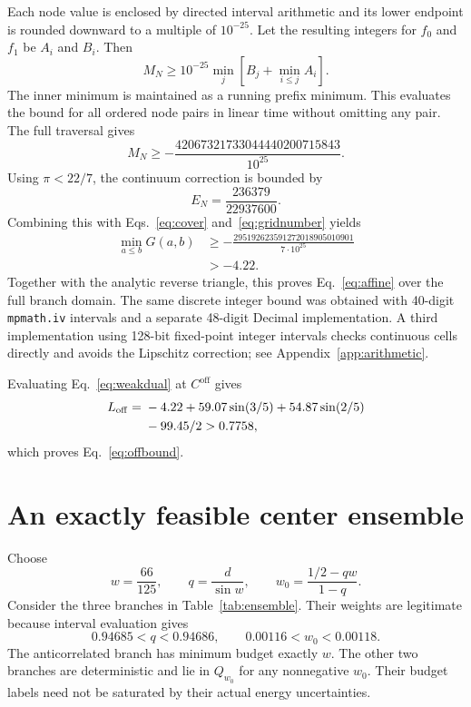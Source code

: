 \documentclass[aps,pra,reprint,amsmath,amssymb,longbibliography,nofootinbib]{revtex4-2}
\newcommand{\Coff}{C^{\mathrm{off}}}
\newcommand{\Loff}{L_{\mathrm{off}}}
\begin{document}
Each node value is enclosed by directed interval arithmetic and its lower
endpoint is rounded downward to a multiple of $10^{-25}$. Let the resulting
integers for $f_0$ and $f_1$ be $A_i$ and $B_i$. Then
\begin{equation}
 M_N\geq10^{-25}\min_j\left[B_j+\min_{i\leq j}A_i\right].
 \label{eq:prefix}
\end{equation}
The inner minimum is maintained as a running prefix minimum. This evaluates
the bound for all ordered node pairs in linear time without omitting any pair.
The full traversal gives
\begin{equation}
 M_N\geq-\frac{42067321733044440200715843}{10^{25}}.
 \label{eq:gridnumber}
\end{equation}
Using $\pi<22/7$, the continuum correction is bounded by
\begin{equation}
 E_N=\frac{236379}{22937600}.
\end{equation}
Combining this with Eqs.~\eqref{eq:cover} and~\eqref{eq:gridnumber} yields
\begin{equation}
 \begin{aligned}
 \min_{a\leq b}G(a,b)&\geq
 -\frac{295192623591272018905010901}{7\cdot10^{25}}\\
 &>-4.22.
 \end{aligned}
 \label{eq:globalnumber}
\end{equation}
Together with the analytic reverse triangle, this proves
Eq.~\eqref{eq:affine} over the full branch domain. The same discrete integer
bound was obtained with 40-digit \texttt{mpmath.iv} intervals and a separate
48-digit Decimal implementation. A third implementation using 128-bit
fixed-point integer intervals checks continuous cells directly and avoids
the Lipschitz correction; see Appendix~\ref{app:arithmetic}.

Evaluating Eq.~\eqref{eq:weakdual} at $\Coff$ gives
\begin{align}
 \Loff={}&-4.22+59.07\sin(3/5)+54.87\sin(2/5)\notag\\
 &-99.45/2>0.7758,
 \label{eq:L}
\end{align}
which proves Eq.~\eqref{eq:offbound}.

\section{An exactly feasible center ensemble}\label{sec:primal}

Choose
\begin{equation}
 w=\frac{66}{125},\qquad q=\frac{d}{\sin w},\qquad
 w_0=\frac{1/2-qw}{1-q}.
 \label{eq:ensemblepars}
\end{equation}
Consider the three branches in Table~\ref{tab:ensemble}.
Their weights are legitimate because interval evaluation gives
\begin{equation}
 0.94685<q<0.94686,\qquad 0.00116<w_0<0.00118.
 \label{eq:feasible}
\end{equation}
The anticorrelated branch has minimum budget exactly $w$. The other two
branches are deterministic and lie in $Q_{w_0}$ for any nonnegative $w_0$.
Their budget labels need not be saturated by their actual energy uncertainties.
\end{document}
